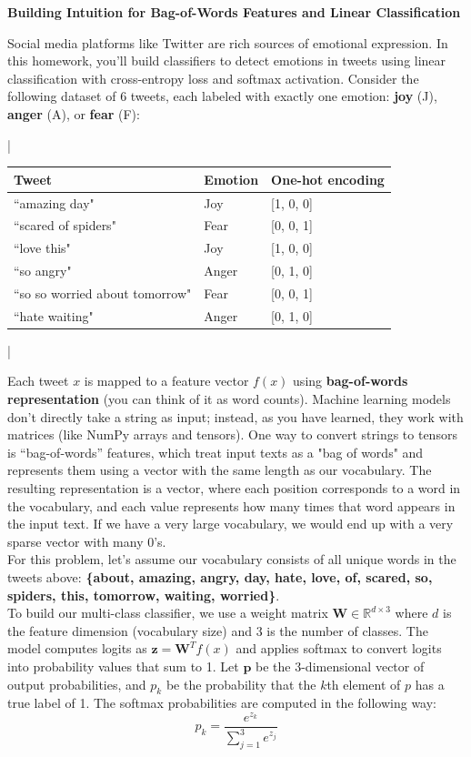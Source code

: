 \item {\bf Building Intuition for Bag-of-Words Features and Linear Classification}

Social media platforms like Twitter are rich sources of emotional expression. In this homework, you'll build classifiers to detect emotions in tweets using linear classification with cross-entropy loss and softmax activation. Consider the following dataset of 6 tweets, each labeled with exactly one emotion: \textbf{joy} (J), \textbf{anger} (A), or \textbf{fear} (F):

\begin{table}[h]
\centering
\lstDeleteShortInline|
\begin{tabular}{|l|l|l|}
\hline
Tweet & Emotion & One-hot encoding \\
\hline
``amazing day" & Joy & [1, 0, 0] \\
``scared of spiders" & Fear & [0, 0, 1] \\
``love this" & Joy & [1, 0, 0] \\
``so angry" & Anger & [0, 1, 0] \\
``so so worried about tomorrow" & Fear & [0, 0, 1] \\
``hate waiting" & Anger & [0, 1, 0] \\
\hline
\end{tabular}
\lstMakeShortInline|
\end{table}

Each tweet $x$ is mapped to a feature vector $f(x)$ using \textbf{bag-of-words representation} (you can think of it as word counts). Machine learning models don't directly take a string as input; instead, as you have learned, they work with matrices (like NumPy arrays and tensors). One way to convert strings to tensors is “bag-of-words” features, which treat input texts as a "bag of words" and represents them using a vector with the same length as our vocabulary. The resulting representation is a vector, where each position corresponds to a word in the vocabulary, and each value represents how many times that word appears in the input text. If we have a very large vocabulary, we would end up with a very sparse vector with many 0's.\\

For this problem, let's assume our vocabulary consists of all unique words in the tweets above: \textbf{\{about, amazing, angry, day, hate, love, of, scared, so, spiders, this, tomorrow, waiting, worried\}}.\\

To build our multi-class classifier, we use a weight matrix $\mathbf{W} \in \mathbb{R}^{d \times 3}$ where $d$ is the feature dimension (vocabulary size)
and 3 is the number of classes. The model computes logits as $\mathbf{z} = \mathbf{W}^T f(x)$ and applies softmax to convert
logits into probability values that sum to 1. Let $\mathbf{p}$ be the 3-dimensional vector of output probabilities, and $p_k$ be
the probability that the $k$th element of $p$ has a true label of 1. The softmax probabilities are computed in the following way:
$$p_k = \frac{e^{z_k}}{\sum_{j=1}^{3} e^{z_j}}$$

